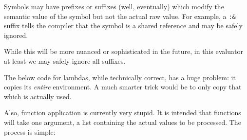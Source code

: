 \documentclass[]{article}
\newenvironment{Shaded}{}{}
\newcommand{\KeywordTok}[1]{\textcolor[rgb]{0.00,0.44,0.13}{\textbf{{#1}}}}
\newcommand{\DataTypeTok}[1]{\textcolor[rgb]{0.56,0.13,0.00}{{#1}}}
\newcommand{\OtherTok}[1]{\textcolor[rgb]{0.00,0.44,0.13}{{#1}}}
\newcommand{\FunctionTok}[1]{\textcolor[rgb]{0.02,0.16,0.49}{{#1}}}
\newcommand{\NormalTok}[1]{{#1}}
\begin{document}
\begin{Shaded}
\end{Shaded}

Symbols may have prefixes or suffixes (well, eventually) which modify
the semantic value of the symbol but not the actual raw value. For
example, a \texttt{:\&} suffix tells the compiler that the symbol is a
shared reference and may be safely ignored.

While this will be more nuanced or sophisticated in the future, in this
evaluator at least we may safely ignore all suffixes.

\begin{Shaded}
\end{Shaded}

\begin{Shaded}
\end{Shaded}

The below code for lambdas, while technically correct, has a huge
problem: it copies its \emph{entire} environment. A much smarter trick
would be to only copy that which is actually used.

Also, function application is currently very stupid. It is intended that
functions will take one argument, a list containing the actual values to
be processed. The process is simple:
\end{document}
